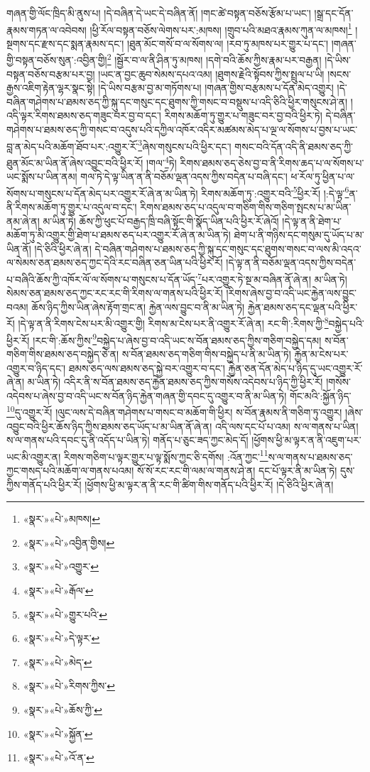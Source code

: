 གཞན་གྱི་ལོང་ཁྲིད་མི་ནུས་པ། །དེ་བཞིན་དེ་ཡང་དེ་བཞིན་ནོ། །གང་ཚེ་བསྟན་བཅོས་རྩོམ་པ་ཡང་། །སྒྲ་དང་དོན་རྣམས་གཏན་ལ་འབེབས། །ཕྱི་རོལ་བསྟན་བཅོས་ལེགས་པར་:མཁས། །གྲུབ་པའི་མཐའ་རྣམས་ཀུན་ལ་མཁས།\footnote{«སྣར་»«པེ་»མཁས།} །སྔགས་དང་རྫས་དང་སྨན་རྣམས་དང་། །ཐུན་མོང་གསོ་བ་ལ་སོགས་ལ། །རབ་ཏུ་མཁས་པར་གྱུར་པ་དང་། །གཞན་གྱི་བསྟན་བཅོས་སུན་:འབྱིན་གྱི།\footnote{«སྣར་»«པེ་»འབྱིན་གྱིས།} །སྦྱོར་བ་ལ་ནི་ཤིན་ཏུ་མཁས། །དགེ་བའི་ཆོས་ཀྱིས་རྣམ་པར་བརྒྱན། །དེ་ཡིས་བསྟན་བཅོས་བརྩམ་པར་བྱ། །ཡང་ན་བྱང་ཆུབ་སེམས་དཔའ་འམ། །ཐུགས་རྗེའི་སྟོབས་ཀྱིས་སྤྲུལ་པ་ཡི། །སངས་རྒྱས་འཇིག་རྟེན་ལྷར་སྣང་སྟེ། །དེ་ཡིས་བརྩམ་བྱ་མ་གཏོགས་པ། །གཞན་གྱིས་བརྩམས་པ་དོན་མེད་འགྱུར། །དེ་བཞིན་གཤེགས་པ་ཐམས་ཅད་ཀྱི་སྐུ་དང་གསུང་དང་ཐུགས་ཀྱི་གསང་བ་བསྡུས་པ་འདི་ཅིའི་ཕྱིར་གསུངས་ཤེ་ན། །འདི་ལྟར་རིགས་ཐམས་ཅད་གཟུང་བར་བྱ་བ་དང་། རིགས་མཆོག་ཏུ་གྱུར་པ་གཟུང་བར་བྱ་བའི་ཕྱིར་ཏེ། དེ་བཞིན་གཤེགས་པ་ཐམས་ཅད་ཀྱི་གསང་བ་འདུས་པའི་དཀྱིལ་འཁོར་འདིར་མཚམས་མེད་པ་ལྔ་ལ་སོགས་པ་བྱས་པ་ཡང་བླ་ན་མེད་པའི་མཆོག་ཐོབ་པར་:འགྱུར་རོ་\footnote{«སྣར་»«པེ་»འགྱུར་}ཞེས་གསུངས་པའི་ཕྱིར་དང་། གསང་བའི་དོན་འདི་ནི་ཐམས་ཅད་ཀྱི་ཐུན་མོང་མ་ཡིན་ནོ་ཞེས་འབྱུང་བའི་ཕྱིར་རོ། །གལ་\footnote{«སྣར་»«པེ་»རྒོལ་}ཏེ། རིགས་ཐམས་ཅད་ཅེས་བྱ་བ་ནི་རིགས་ཆད་པ་ལ་སོགས་པ་ཡང་སྨོས་པ་ཡིན་ནམ། གལ་ཏེ་དེ་ལྟ་ཡིན་ན་ནི་བཅོམ་ལྡན་འདས་ཀྱིས་བདེན་པ་བཞི་དང་། ཕ་རོལ་ཏུ་ཕྱིན་པ་ལ་སོགས་པ་གསུངས་པ་དོན་མེད་པར་འགྱུར་རོ་ཞེ་ན་མ་ཡིན་ཏེ། རིགས་མཆོག་ཏུ་:འགྱུར་བའི་\footnote{«སྣར་»«པེ་»གྱུར་པའི་}ཕྱིར་རོ། །:དེ་ལྟ་\footnote{«སྣར་»«པེ་»དེ་ལྟར་}ན་ནི་རིགས་མཆོག་ཏུ་གྱུར་པ་འདུལ་བ་དང་། རིགས་ཐམས་ཅད་པ་འདུལ་བ་གཅིག་གིས་གཅིག་སྤངས་པ་མ་ཡིན་ནམ་ཞེ་ན། མ་ཡིན་ཏེ། ཆོས་ཀྱི་ཕུང་པོ་བརྒྱད་ཁྲི་བཞི་སྟོང་གི་སྣོད་ཡིན་པའི་ཕྱིར་རོ་ཞེའོ། །དེ་ལྟ་ན་ནི་ཐེག་པ་མཆོག་ཏུ་མི་འགྱུར་གྱི་ཐེག་པ་ཐམས་ཅད་པར་འགྱུར་རོ་ཞེ་ན་མ་ཡིན་ཏེ། ཐེག་པ་ནི་གཉིས་དང་གསུམ་དུ་ཡོད་པ་མ་ཡིན་ནོ། །དེ་ཅིའི་ཕྱིར་ཞེ་ན། དེ་བཞིན་གཤེགས་པ་ཐམས་ཅད་ཀྱི་སྐུ་དང་གསུང་དང་ཐུགས་གསང་བ་ལས་མི་འདའ་ལ་སེམས་ཅན་ཐམས་ཅད་ཀྱང་དེའི་རང་བཞིན་ཅན་ཡིན་པའི་ཕྱིར་རོ། །དེ་ལྟ་ན་ནི་བཅོམ་ལྡན་འདས་ཀྱིས་བདེན་པ་བཞིའི་ཆོས་ཀྱི་འཁོར་ལོ་ལ་སོགས་པ་གསུངས་པ་དོན་ཡོད་\footnote{«སྣར་»«པེ་»མེད་}པར་འགྱུར་ཏེ་སྔ་མ་བཞིན་ནོ་ཞེ་ན། མ་ཡིན་ཏེ། སེམས་ཅན་ཐམས་ཅད་ཀྱང་རང་རང་གི་རིགས་ལ་གནས་པའི་ཕྱིར་རོ། །རིགས་ཞེས་བྱ་བ་འདི་ཡང་རྐྱེན་ལས་བྱུང་བའམ། ཆོས་ཉིད་ཀྱིས་ཡིན་ཞེས་རྟོག་གྲང་ན། རྐྱེན་ལས་བྱུང་བ་ནི་མ་ཡིན་ཏེ། རྐྱེན་ཐམས་ཅད་དང་ལྡན་པའི་ཕྱིར་རོ། །དེ་ལྟ་ན་ནི་རིགས་ངེས་པར་མི་འགྱུར་གྱི། རིགས་མ་ངེས་པར་ནི་འགྱུར་རོ་ཞེ་ན། རང་གི་:རིགས་ཀྱི་\footnote{«སྣར་»«པེ་»རིགས་ཀྱིས་}བསྐྱེད་པའི་ཕྱིར་རོ། །རང་གི་:ཆོས་ཀྱིས་\footnote{«སྣར་»«པེ་»ཆོས་ཀྱི་}བསྐྱེད་པ་ཞེས་བྱ་བ་འདི་ཡང་ས་བོན་ཐམས་ཅད་ཀྱིས་གཅིག་བསྐྱེད་དམ། ས་བོན་གཅིག་གིས་ཐམས་ཅད་བསྐྱེད་ཅེ་ན། ས་བོན་ཐམས་ཅད་གཅིག་གིས་བསྐྱེད་པ་ནི་མ་ཡིན་ཏེ། རྐྱེན་མ་ངེས་པར་འགྱུར་བ་ཉིད་དང་། ཐམས་ཅད་ལས་ཐམས་ཅད་སྐྱེ་བར་འགྱུར་བ་དང་། རྐྱེན་ཅན་དོན་མེད་པ་ཉིད་དུ་ཡང་འགྱུར་རོ་ཞེ་ན། མ་ཡིན་ཏེ། འདིར་ནི་ས་བོན་ཐམས་ཅད་རྐྱེན་ཐམས་ཅད་ཀྱིས་གསོས་འདེབས་པ་ཉིད་ཀྱི་ཕྱིར་རོ། །གསོས་འདེབས་པ་ཞེས་བྱ་བ་འདི་ཡང་ས་བོན་ཉིད་རྐྱེན་གཞན་གྱི་དབང་དུ་འགྱུར་བ་ནི་མ་ཡིན་ཏེ། གོང་མའི་:སྐྱོན་ཉིད་\footnote{«སྣར་»«པེ་»སྐྱོན་}དུ་འགྱུར་རོ། །ལུང་ལས་དེ་བཞིན་གཤེགས་པ་གསང་བ་མཆོག་གི་ཕྱིར། ས་བོན་རྣམས་ནི་གཅིག་ཏུ་འགྱུར། །ཞེས་འབྱུང་བའི་ཕྱིར་ཆོས་ཉིད་ཀྱིས་ཐམས་ཅད་ཡོད་པ་མ་ཡིན་ནོ་ཞེ་ན། འདི་ལས་དང་པོ་པ་འམ། ས་ལ་གནས་པ་ཡིན། ས་ལ་གནས་པའི་དབང་དུ་ནི་འདོད་པ་ཡིན་ཏེ། གནོད་པ་ཅུང་ཟད་ཀྱང་མེད་དོ། །ཕྱོགས་ཕྱི་མ་ལྟར་ན་ནི་འཇུག་པར་ཡང་མི་འགྱུར་ན། རིགས་གཅིག་པ་ལྟར་གྱུར་པ་ལྟ་སྨོས་ཀྱང་ཅི་དགོས། :འོན་ཀྱང་\footnote{«སྣར་»«པེ་»འོ་ན་}ས་ལ་གནས་པ་ཐམས་ཅད་ཀྱང་གསད་པའི་མཆོག་ལ་གནས་པའམ། སོ་སོ་རང་རང་གི་ལམ་ལ་གནས་ཤེ་ན། དང་པོ་ལྟར་ནི་མ་ཡིན་ཏེ། དུས་ཀྱིས་གནོད་པའི་ཕྱིར་རོ། །ཕྱོགས་ཕྱི་མ་ལྟར་ན་ནི་རང་གི་ཚིག་གིས་གནོད་པའི་ཕྱིར་རོ། །དེ་ཅིའི་ཕྱིར་ཞེ་ན། 